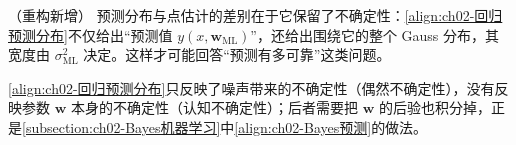 \documentclass[../../main.tex]{subfiles}
\begin{document}
\begin{remark}（重构新增）
预测分布与点估计的差别在于它保留了不确定性：\eqref{align:ch02-回归预测分布}不仅给出“预测值 $y(x,\mathbf{w}_{\mathrm{ML}})$”，还给出围绕它的整个 Gauss 分布，其宽度由 $\sigma_{\mathrm{ML}}^{2}$ 决定。这样才可能回答“预测有多可靠”这类问题。

\eqref{align:ch02-回归预测分布}只反映了噪声带来的不确定性（偶然不确定性），没有反映参数 $\mathbf{w}$ 本身的不确定性（认知不确定性）；后者需要把 $\mathbf{w}$ 的后验也积分掉，正是\cref{subsection:ch02-Bayes机器学习}中\eqref{align:ch02-Bayes预测}的做法。
\end{remark}
\end{document}
